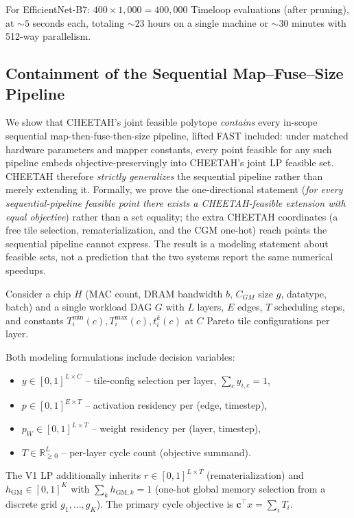 For EfficientNet-B7: $400 \times 1{,}000 = 400{,}000$ Timeloop evaluations (after pruning), at ${\sim}5$ seconds each, totaling ${\sim}23$ hours on a single machine or ${\sim}30$ minutes with 512-way parallelism.

\subsection{Containment of the Sequential Map--Fuse--Size Pipeline}
\label{app:containment}
We show that CHEETAH's joint feasible polytope \emph{contains} every in-scope
sequential map-then-fuse-then-size pipeline, lifted FAST included: under matched
hardware parameters and mapper constants, every point feasible for any such pipeline embeds
objective-preservingly into CHEETAH's joint LP feasible set. CHEETAH therefore
\emph{strictly generalizes} the sequential pipeline rather than merely extending
it. Formally, we prove the one-directional statement (\emph{for every
sequential-pipeline feasible point there exists a CHEETAH-feasible extension
with equal objective}) rather than a set equality; the extra CHEETAH
coordinates (a free tile selection, rematerialization, and the CGM one-hot)
reach points the sequential pipeline cannot express. The result is a modeling
statement about feasible sets, not a prediction that the two systems report the
same numerical speedups.

Consider a chip $H$ (MAC count, DRAM bandwidth $b$, $C_{GM}$ size $g$, datatype, batch) and a single workload DAG $G$ with $L$ layers, $E$ edges, $T$ scheduling steps, and constants $T_i^{\min}(c), T_i^{\max}(c), t_i^k(c)$ at $C$ Pareto tile configurations per layer. 

Both modeling formulations include decision variables:
\begin{itemize}\setlength{\itemsep}{0pt}\setlength{\topsep}{0pt}
  \item $y \in [0,1]^{L \times C}$ -- tile-config selection per layer, $\sum_c y_{i,c}{=}1$,
  \item $p \in [0,1]^{E \times T}$ -- activation residency per (edge, timestep),
  \item $p_W \in [0,1]^{L \times T}$ -- weight residency per (layer, timestep),
  \item $T \in \mathbb{R}_{\ge 0}^{L}$ -- per-layer cycle count (objective summand).
\end{itemize}
The V1 LP additionally inherits $r \in [0,1]^{L \times T}$ (rematerialization) and
$h_{\mathrm{GM}} \in [0,1]^{K}$ with $\sum_k h_{\mathrm{GM},k}{=}1$ (one-hot global memory selection from a
discrete grid $g_1,\ldots,g_K$). The primary cycle objective is $\mathbf{c}^\top x = \sum_i T_i$.

